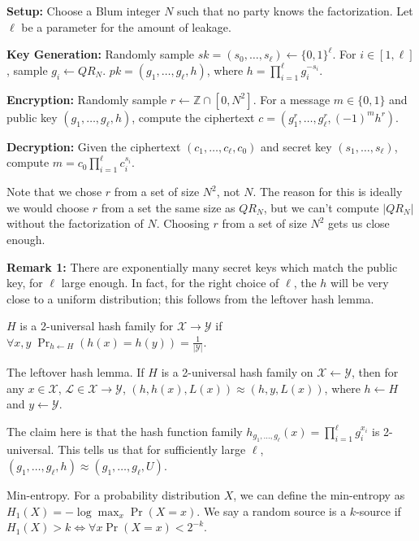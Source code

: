 \documentclass[10pt]{article}
\begin{document}
\textbf{Setup:} Choose a Blum integer $N$ such that no party knows the factorization. Let $\ell$ be a parameter for the amount of leakage.

\textbf{Key Generation:} Randomly sample  $sk = (s_0,\dots,s_\ell) \leftarrow \{0,1\}^\ell$. For $i \in [1,\ell]$, sample $g_i \leftarrow QR_N$. $pk = (g_1,\dots,g_\ell,h)$, where $h = \prod_{i=1}^\ell g_i^{-s_i}$.

\textbf{Encryption:} Randomly sample $r \leftarrow \mathbb{Z} \cap [0,N^2]$. For a message $m \in \{0,1\}$ and public key $(g_1,\dots,g_\ell,h)$, compute the ciphertext $c = (g_1^r,\dots,g_\ell^r,(-1)^m h^r)$. 

\textbf{Decryption:} Given the ciphertext $(c_1,\dots,c_\ell,c_0)$ and secret key $(s_1,\dots,s_\ell)$, compute $m = c_0 \prod_{i=1}^\ell c_i^{s_i}$.

Note that we chose $r$ from a set of size $N^2$, not $N$. The reason for this is ideally we would choose $r$ from a set the same size as $QR_N$, but we can't compute $|QR_N|$ without the factorization of $N$. Choosing $r$ from a set of size $N^2$ gets us close enough.

\textbf{Remark 1:} There are exponentially many secret keys which match the public key, for $\ell$ large enough. In fact, for the right choice of $\ell$, the $h$ will be very close to a uniform distribution; this follows from the leftover hash lemma. 

\begin{definition}
$H$ is a 2-universal hash family for $\mathcal{X} \rightarrow \mathcal{Y}$ if $\forall x,y \; \Pr_{h \leftarrow H}(h(x) = h(y)) = \frac{1}{|\mathcal{Y}|}$.
\end{definition}

\begin{lemma}
The leftover hash lemma. If $H$ is a 2-universal hash family on $\mathcal{X} \leftarrow \mathcal{Y}$, then for any $x \in \mathcal{X}$, $\mathcal{L} \in \mathcal{X} \rightarrow \mathcal{Y}$, $(h,h(x),L(x)) \approx (h,y,L(x))$, where $h \leftarrow H$ and $y \leftarrow \mathcal{Y}$.
\end{lemma}

The claim here is that the hash function family $h_{g_1,\dots,g_\ell}(x) = \prod_{i=1}^\ell g_i ^ {x_i}$ is 2-universal. This tells us that for sufficiently large $\ell$, $(g_1,\dots,g_\ell,h) \approx (g_1,\dots,g_\ell,U)$.

\begin{definition}
Min-entropy. For a probability distribution $X$, we can define the min-entropy as $H_1(X) = -\log \max_x \Pr(X = x)$. We say a random source is a $k$-source if $H_1(X) > k \iff \forall x \Pr(X = x) < 2^{-k}$.
\end{definition}
\end{document}

